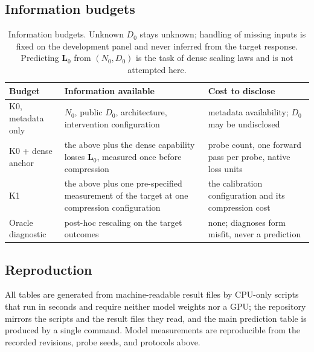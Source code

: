 \subsection{Information budgets}
\begin{table}[H]
\centering\small
\begin{tabular}{@{}p{2.5cm}p{5.7cm}p{4.9cm}@{}}
\toprule
Budget & Information available & Cost to disclose \\
\midrule
K0, metadata only & $N_0$, public $D_0$, architecture, intervention
configuration & metadata availability; $D_0$ may be undisclosed \\
K0 + dense anchor & the above plus the dense capability losses
$\mathbf L_0$, measured once before compression & probe count, one
forward pass per probe, native loss units \\
K1 & the above plus one pre-specified measurement of the target at one
compression configuration & the calibration configuration and its
compression cost \\
Oracle diagnostic & post-hoc rescaling on the target outcomes & none;
diagnoses form misfit, never a prediction \\
\bottomrule
\end{tabular}
\caption{Information budgets. Unknown $D_0$ stays unknown; handling of
missing inputs is fixed on the development panel and never inferred
from the target response. Predicting $\mathbf L_0$ from $(N_0,D_0)$ is
the task of dense scaling laws and is not attempted here.}
\label{tab:budgets}
\end{table}

\subsection{Reproduction}
\label{sec:app_repro}
All tables are generated from machine-readable result files by
CPU-only scripts that run in seconds and require neither model weights
nor a GPU; the repository mirrors the scripts and the result files
they read, and the main prediction table is produced by a single
command. Model measurements are reproducible from the recorded
revisions, probe seeds, and protocols above.

\FloatBarrier